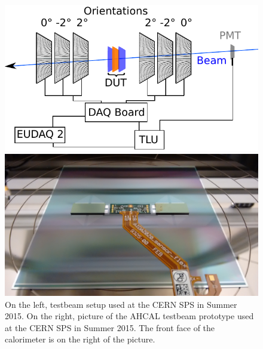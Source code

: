 \begin{figure}[!ht]%
\centering
\hspace{-100px}
\parbox{1.2in}{
\includegraphics[width=2.5\linewidth]{pics/principle.pdf}
}%
\hspace{150px}
\begin{minipage}{1.2in}%
\includegraphics[width=2.5\linewidth]{pics/sensor_module1.jpg}
\end{minipage}%
\caption{On the left, testbeam setup used at the CERN SPS in Summer 2015. On the right, picture of the AHCAL testbeam prototype used at the CERN SPS in Summer 2015. The front face of the calorimeter is on the right of the picture.}%
\label{fig:1figs}%
\end{figure}



